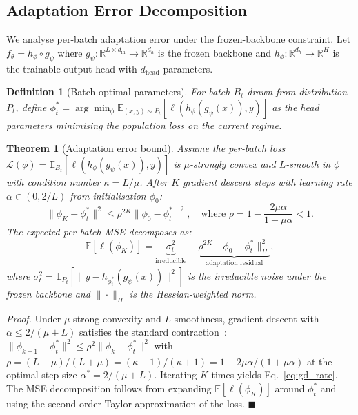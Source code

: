 \documentclass[journal]{IEEEtran}
\newtheorem{theorem}{Theorem}
\newtheorem{definition}{Definition}
\renewenvironment{proof}[1][Proof]{\noindent\textit{#1.}\space}{\hfill$\blacksquare$\par\medskip}
\begin{document}
\subsection{Adaptation Error Decomposition}
\label{sec:theory_adapt}

We analyse per-batch adaptation error under the frozen-backbone constraint. Let $f_\theta = h_\phi \circ g_\psi$ where $g_\psi: \mathbb{R}^{L \times d_{\text{in}}} \to \mathbb{R}^{d_h}$ is the frozen backbone and $h_\phi: \mathbb{R}^{d_h} \to \mathbb{R}^H$ is the trainable output head with $d_{\text{head}}$ parameters.

\begin{definition}[Batch-optimal parameters]
\label{def:batch_opt}
For batch $B_t$ drawn from distribution $P_t$, define $\phi^*_t = \arg\min_\phi \mathbb{E}_{(x,y) \sim P_t}[\ell(h_\phi(g_\psi(x)), y)]$ as the head parameters minimising the population loss on the current regime.
\end{definition}

\begin{theorem}[Adaptation error bound]
\label{thm:adaptation}
Assume the per-batch loss $\mathcal{L}(\phi) = \mathbb{E}_{B_t}[\ell(h_\phi(g_\psi(x)), y)]$ is $\mu$-strongly convex and $L$-smooth in $\phi$ with condition number $\kappa = L/\mu$. After $K$ gradient descent steps with learning rate $\alpha \in (0, 2/L)$ from initialisation $\phi_0$:
\begin{equation}
    \|\phi_K - \phi^*_t\|^2 \leq \rho^{2K} \|\phi_0 - \phi^*_t\|^2, \quad \text{where } \rho = 1 - \frac{2\mu\alpha}{1 + \mu\alpha} < 1.
    \label{eq:gd_rate}
\end{equation}
The expected per-batch MSE decomposes as:
\begin{equation}
    \mathbb{E}[\ell(\phi_K)] = \underbrace{\sigma^2_t}_{\text{irreducible}} + \underbrace{\rho^{2K} \|\phi_0 - \phi^*_t\|^2_H}_{\text{adaptation residual}},
    \label{eq:error_decomp}
\end{equation}
where $\sigma^2_t = \mathbb{E}_{P_t}[\|y - h_{\phi^*_t}(g_\psi(x))\|^2]$ is the irreducible noise under the frozen backbone and $\|\cdot\|_H$ is the Hessian-weighted norm.
\end{theorem}

\begin{proof}
Under $\mu$-strong convexity and $L$-smoothness, gradient descent with $\alpha \leq 2/(\mu + L)$ satisfies the standard contraction~\cite{nesterov2004introductory}:
$\|\phi_{k+1} - \phi^*_t\|^2 \leq \rho^2 \|\phi_k - \phi^*_t\|^2$ with $\rho = (L - \mu)/(L + \mu) = (\kappa - 1)/(\kappa + 1) = 1 - 2\mu\alpha/(1 + \mu\alpha)$ at the optimal step size $\alpha^* = 2/(\mu + L)$.
Iterating $K$ times yields Eq.~\ref{eq:gd_rate}. The MSE decomposition follows from expanding $\mathbb{E}[\ell(\phi_K)]$ around $\phi^*_t$ and using the second-order Taylor approximation of the loss.
\end{proof}
\end{document}
